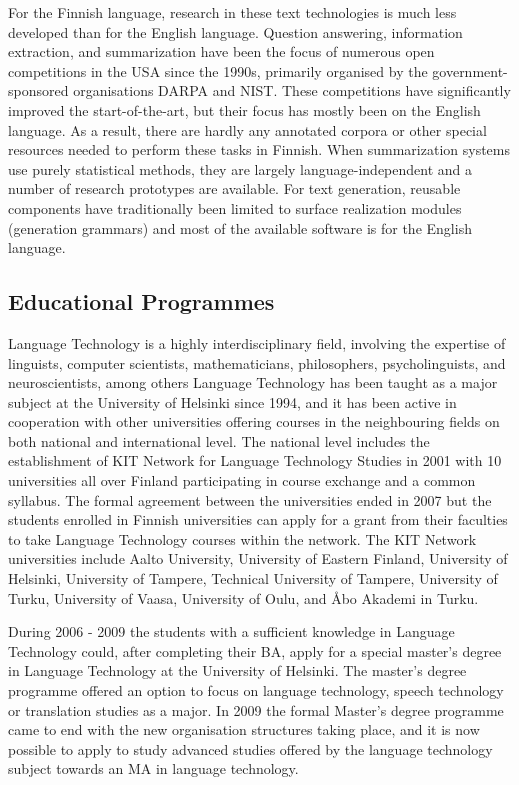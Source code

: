 \documentclass[]{../../metanetpaper}
\begin{document}
\begin{multicols}{2}
For the Finnish language, research in these text technologies is much
less developed than for the English language. Question answering,
information extraction, and summarization have been the focus of
numerous open competitions in the USA since the 1990s, primarily
organised by the government-sponsored organisations DARPA and
NIST. These competitions have significantly improved the
start-of-the-art, but their focus has mostly been on the English
language.  As a result, there are hardly any annotated corpora or
other special resources needed to perform these tasks in Finnish. When
summarization systems use purely statistical methods, they are largely
language-independent and a number of research prototypes are
available. For text generation, reusable components have traditionally
been limited to surface realization modules (generation grammars) and
most of the available software is for the English language.  


\subsection{Educational Programmes}

Language Technology is a highly interdisciplinary field, involving the
expertise of linguists, computer scientists, mathematicians, philosophers,
psycholinguists, and neuroscientists, among others Language Technology has been
taught as a major subject at the University of Helsinki since 1994, and it has
been active in cooperation with other universities offering courses in the
neighbouring fields on both national and international level. The national
level includes the establishment of KIT Network for Language Technology Studies
in 2001 with 10 universities all over Finland participating in course exchange
and a common syllabus. The formal agreement between the universities ended in
2007 but the students enrolled in Finnish universities can apply for a grant
from their faculties to take Language Technology courses within the network.
The KIT Network universities include Aalto University, University of Eastern
Finland, University of Helsinki, University of Tampere, Technical University of
Tampere, University of Turku, University of Vaasa, University of Oulu, and Åbo
Akademi in Turku.

During 2006 - 2009 the students with a sufficient knowledge in Language
Technology could, after completing their BA, apply for a special master's
degree in Language Technology at the University of Helsinki. The master's
degree programme offered an option to focus on language technology, speech
technology or translation studies as a major. In 2009 the formal Master's
degree programme came to end with the new organisation structures taking place,
and it is now possible to apply to study advanced studies offered by the
language technology subject towards an MA in language technology.


\end{multicols}
\end{document}
